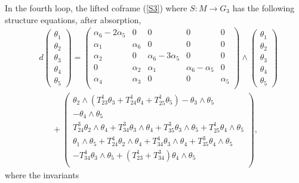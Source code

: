 \documentclass[12pt]{article}
\begin{document}
In the fourth loop, the lifted coframe (\ref{S3}) where $S:M\rightarrow G_3$ has the following structure equations, after absorption, 
\begin{equation}
\begin{aligned}
&d\begin{pmatrix}
\theta_1\\
\theta_2\\
\theta_3\\
\theta_4\\
\theta_5
\end{pmatrix}
=\begin{pmatrix}
\alpha_6-2\alpha_5&0&0&0&0\\
\alpha_1&\alpha_6&0&0&0\\
\alpha_2&0&\alpha_{6}-3\alpha_5&0&0\\
0&\alpha_{2}&\alpha_{1}&\alpha_{6}-\alpha_{5}&0\\
\alpha_{4}&\alpha_{3}&0&0&\alpha_{5}\\
\end{pmatrix}\wedge
\begin{pmatrix}
\theta_1\\
\theta_2\\
\theta_3\\
\theta_4\\
\theta_5
\end{pmatrix}\\
&~~~~~~~+\begin{pmatrix}
\theta_2\wedge(T^1_{23}\theta_3+T^1_{24}\theta_4+T^1_{25}\theta_5)-\theta_3\wedge\theta_5\\
-\theta_4\wedge\theta_5\\
T^3_{24}\theta_2\wedge\theta_4+T^3_{34}\theta_3\wedge\theta_4+T^3_{35}\theta_3\wedge\theta_5+T^1_{25}\theta_4\wedge\theta_5\\
\theta_1\wedge\theta_5+T^4_{24}\theta_2\wedge\theta_4+T^4_{34}\theta_3\wedge\theta_4+T^3_{35}\theta_4\wedge\theta_5\\
-T^4_{34}\theta_3\wedge\theta_5+(T^1_{23}+T^3_{34})\theta_4\wedge\theta_5\\
\end{pmatrix},
\end{aligned}
\end{equation}
where the invariants
\end{document}
